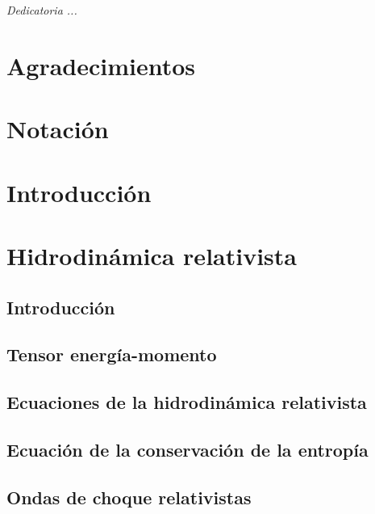 \documentclass[letterpaper,12pt,oneside]{book}
\begin{document}
\frontmatter
\chapter*{}
\begin{flushright}%
  \emph{Dedicatoria ...}
  \thispagestyle{empty}
\end{flushright}

\chapter{Agradecimientos}

\chapter{Notación}

\chapter{Introducción}

\tableofcontents
\listoffigures

    
\mainmatter

\chapter{Hidrodinámica relativista} \section{Introducción}
    \section{Tensor energía-momento}
    \section{Ecuaciones de la hidrodinámica relativista}
    \section{Ecuación de la conservación de la entropía}
    \section{Ondas de choque relativistas}
\end{document}
